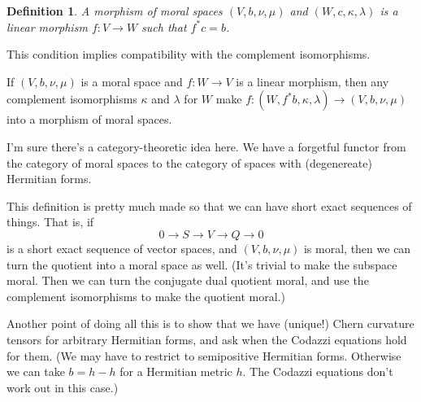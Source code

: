 \documentclass[10pt,a4paper]{article}
\newtheorem{defi}[theo]{Definition}
\begin{document}
\begin{defi}
A \emph{morphism} of moral spaces $(V,b,\nu,\mu)$ and $(W,c,\kappa,\lambda)$ is a linear morphism $f : V \to W$ such that $f^*c = b$.
\end{defi}

This condition implies compatibility with the complement isomorphisms.


If $(V,b,\nu,\mu)$ is a moral space and $f : W \to V$ is a linear morphism, then any complement isomorphisms $\kappa$ and $\lambda$ for $W$ make $f : (W,f^*b,\kappa,\lambda) \to (V,b,\nu,\mu)$ into a morphism of moral spaces.

I'm sure there's a category-theoretic idea here. We have a forgetful functor from the category of moral spaces to the category of spaces with (degenereate) Hermitian forms.

This definition is pretty much made so that we can have short exact sequences of things. That is, if
\[
0 \to S \to V \to Q \to 0
\]
is a short exact sequence of vector spaces, and $(V,b,\nu,\mu)$ is moral, then we can turn the quotient into a moral space as well. (It's trivial to make the subspace moral. Then we can turn the conjugate dual quotient moral, and use the complement isomorphisms to make the quotient moral.)

Another point of doing all this is to show that we have (unique!) Chern curvature tensors for arbitrary Hermitian forms, and ask when the Codazzi equations hold for them. (We may have to restrict to semipositive Hermitian forms. Otherwise we can take $b = h - h$ for a Hermitian metric $h$. The Codazzi equations don't work out in this case.)




\end{document}
